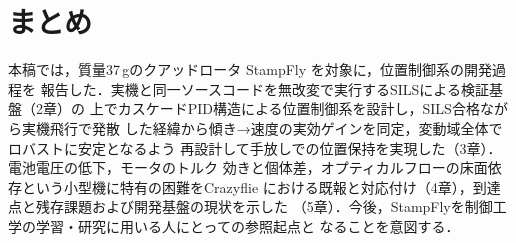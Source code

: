 \documentclass[a4paper,twocolumn,10pt]{ltjsarticle}
\begin{document}
\section{まとめ}
本稿では，質量37\,gのクアッドロータ StampFly を対象に，位置制御系の開発過程を
報告した．実機と同一ソースコードを無改変で実行するSILSによる検証基盤（2章）の
上でカスケードPID構造による位置制御系を設計し，SILS合格ながら実機飛行で発散
した経緯から傾き→速度の実効ゲインを同定，変動域全体でロバストに安定となるよう
再設計して手放しでの位置保持を実現した（3章）．電池電圧の低下，モータのトルク
効きと個体差，オプティカルフローの床面依存という小型機に特有の困難をCrazyflie
における既報と対応付け（4章），到達点と残存課題および開発基盤の現状を示した
（5章）．今後，StampFlyを制御工学の学習・研究に用いる人にとっての参照起点と
なることを意図する．
\end{document}
